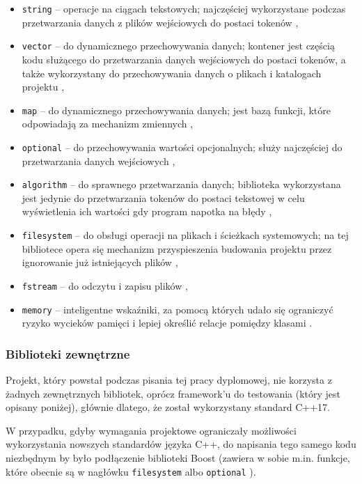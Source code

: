 \begin{itemize}
    \item \texttt{string} -- operacje na ciągach tekstowych; najczęściej wykorzystane podczas przetwarzania danych z plików wejściowych do postaci tokenów \cite{cpp_string}, 
    \item \texttt{vector} -- do dynamicznego przechowywania danych; kontener jest częścią kodu służącego do przetwarzania danych wejściowych do postaci tokenów, a także wykorzystany do przechowywania danych o plikach i katalogach projektu \cite{cpp_vector}, 
    \item \texttt{map} -- do dynamicznego przechowywania danych; jest bazą funkcji, które odpowiadają za mechanizm zmiennych \cite{cpp_map},
    \item \texttt{optional} -- do przechowywania wartości opcjonalnych; służy najczęściej do przetwarzania danych wejściowych \cite{cpp_optional}, 
    \item \texttt{algorithm} -- do sprawnego przetwarzania danych; biblioteka wykorzystana jest jedynie do przetwarzania tokenów do postaci tekstowej w celu wyświetlenia ich wartości gdy program napotka na błędy \cite{cpp_algorithm},
    \item \texttt{filesystem} -- do obsługi operacji na plikach i ścieżkach systemowych; na tej bibliotece opera się mechanizm przyspieszenia budowania projektu przez ignorowanie już istniejących plików \cite{cpp_filesystem}, 
    \item \texttt{fstream} -- do odczytu i zapisu plików \cite{cpp_fstream},
    \item \texttt{memory} -- inteligentne wskaźniki, za pomocą których udało się ograniczyć ryzyko wycieków pamięci i lepiej określić relacje pomiędzy klasami \cite{cpp_memory}.
\end{itemize}

\subsubsection{Biblioteki zewnętrzne}
Projekt, który powstał podczas pisania tej pracy dyplomowej, nie korzysta z żadnych zewnętrznych bibliotek, oprócz framework'u do testowania (który jest opisany poniżej), głównie dlatego, że został wykorzystany standard C++17. 

W przypadku, gdyby wymagania projektowe ograniczały możliwości wykorzystania nowszych standardów języka C++, do napisania tego samego kodu niezbędnym by było podłączenie biblioteki Boost (zawiera w sobie m.in. funkcje, które obecnie są w nagłówku \texttt{filesystem} \cite{cpp_filesystem} albo \texttt{optional} \cite{cpp_optional}).

